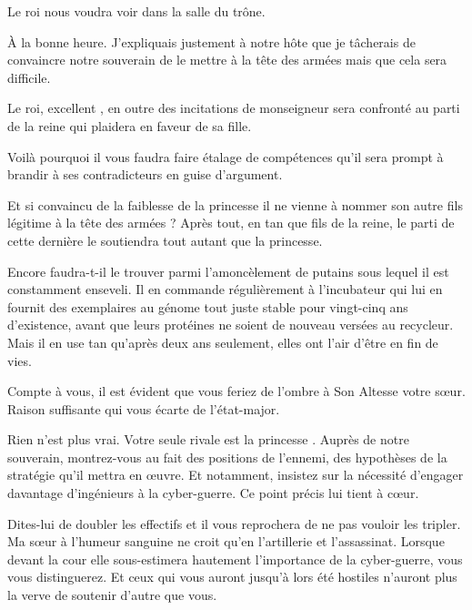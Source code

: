 \scene

\StageDirII{\elena, \general, \alexas}


\begin{drama}
  \alexasspeaks Le roi nous voudra voir dans la salle du trône.

  \elenaspeaks À la bonne heure. J’expliquais justement à notre hôte que je tâcherais de convaincre notre souverain de le mettre à la tête des armées mais que cela sera difficile.

  \alexasspeaks Le roi, excellent \general, en outre des incitations de monseigneur \elena{} sera confronté au parti de la reine qui plaidera en faveur de sa fille. 

  \elenaspeaks Voilà pourquoi il vous faudra faire étalage de compétences qu’il sera prompt à brandir à ses contradicteurs en guise d’argument.

  \generalspeaks Et si convaincu de la faiblesse de la princesse il ne vienne à nommer son autre fils légitime à la tête des armées ? Après tout, en tan que fils de la reine, le parti de cette dernière le soutiendra tout autant que la princesse.

  \elenaspeaks Encore faudra-t-il le trouver parmi l’amoncèlement de putains sous lequel il est constamment enseveli.
  Il en commande régulièrement à l’incubateur qui lui en fournit des exemplaires au génome tout juste stable pour vingt-cinq
  ans d’existence, avant que leurs protéines ne soient de nouveau versées au recycleur. Mais il en use tan qu’après deux ans seulement, elles ont l’air d’être en fin de vies.


  \generalspeaks {} Compte à vous, il est évident que vous feriez de l’ombre à Son Altesse votre sœur. Raison suffisante qui vous écarte de l’état-major.

  \elenaspeaks Rien n’est plus vrai. Votre seule rivale est la princesse \princesse. Auprès de notre souverain, montrez-vous au fait des positions de l’ennemi, des hypothèses de la stratégie qu’il mettra en œuvre. Et notamment, insistez sur la nécessité d’engager davantage d’ingénieurs à la cyber-guerre. Ce point précis lui tient à cœur. 

  Dites-lui de doubler les effectifs et il vous reprochera de ne pas vouloir les tripler. Ma sœur à l’humeur sanguine ne croit qu’en l’artillerie et l’assassinat. Lorsque devant la cour elle sous-estimera hautement l’importance de la cyber-guerre, vous vous distinguerez. Et ceux qui vous auront jusqu’à lors été hostiles n’auront plus la verve de soutenir d’autre que vous.


\end{drama}
